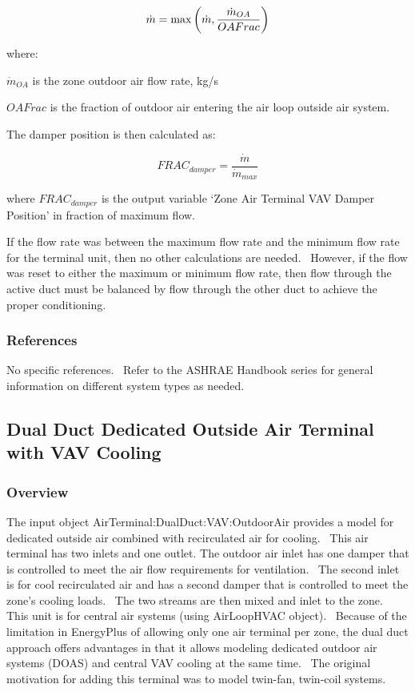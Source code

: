 \begin{equation}
  \dot{m} = \max\PB{ \dot{m}, \frac{\dot{m}_{OA}}{OAFrac} }
\end{equation}

where:

\(\dot m_{OA}\) is the zone outdoor air flow rate, kg/s

\(OAFrac\) is the fraction of outdoor air entering the air loop outside air system.

The damper position is then calculated as:

\begin{equation}
  FRAC_{damper} = \frac{\dot{m}}{\dot{m}_{max}}
\end{equation}

where \(FRA{C_{damper}}\) is the output variable `Zone Air Terminal VAV Damper Position' in fraction of maximum flow.

If the flow rate was between the maximum flow rate and the minimum flow rate for the terminal unit, then no other calculations are needed.~ However, if the flow was reset to either the maximum or minimum flow rate, then flow through the active duct must be balanced by flow through the other duct to achieve the proper conditioning.

\subsubsection{References}\label{references-5}

No specific references.~ Refer to the ASHRAE Handbook series for general information on different system types as needed.

\subsection{Dual Duct Dedicated Outside Air Terminal with VAV Cooling}\label{dual-duct-dedicated-outside-air-terminal-with-vav-cooling}

\subsubsection{Overview}\label{overview-5-000}

The input object AirTerminal:DualDuct:VAV:OutdoorAir provides a model for dedicated outside air combined with recirculated air for cooling.~ This air terminal has two inlets and one outlet. The outdoor air inlet has one damper that is controlled to meet the air flow requirements for ventilation.~ The second inlet is for cool recirculated air and has a second damper that is controlled to meet the zone's cooling loads.~ The two streams are then mixed and inlet to the zone.~ This unit is for central air systems (using AirLoopHVAC object). ~Because of the limitation in EnergyPlus of allowing only one air terminal per zone, the dual duct approach offers advantages in that it allows modeling dedicated outdoor air systems (DOAS) and central VAV cooling at the same time.~ The original motivation for adding this terminal was to model twin-fan, twin-coil systems.

